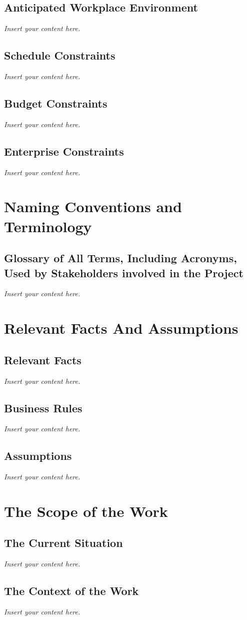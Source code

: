 \documentclass[12pt]{article}
\newcommand{\lips}{\textit{Insert your content here.}}
\begin{document}
\subsection{Anticipated Workplace Environment}
\lips
\subsection{Schedule Constraints}
\lips
\subsection{Budget Constraints}
\lips
\subsection{Enterprise Constraints}
\lips

\section{Naming Conventions and Terminology}
\subsection{Glossary of All Terms, Including Acronyms, Used by Stakeholders
involved in the Project}
\lips

\section{Relevant Facts And Assumptions}
\subsection{Relevant Facts}
\lips
\subsection{Business Rules}
\lips
\subsection{Assumptions}
\lips

\section{The Scope of the Work}
\subsection{The Current Situation}
\lips
\subsection{The Context of the Work}
\lips
\end{document}
